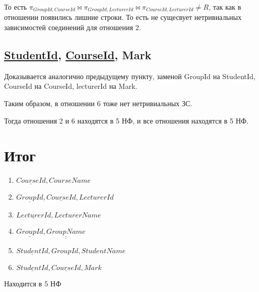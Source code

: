 \documentclass{article}
\begin{document}
	
	То есть $\pi_{GroupId, CourseId} \bowtie \pi_{GroupId, LecturerId} \bowtie  \pi_{CourseId, LecturerId} \neq R$, так как в отношении появились лишние строки. То есть не сущесвует нетривиальных зависимостей соединений для отношения 2.
	
	\subsection{\underline{StudentId}, \underline{CourseId}, Mark}
	
	Доказывается аналогично предыдущему пункту, заменой GroupId на StudentId, CourseId на CourseId, lecturerId на Mark.
	
	Таким образом, в отношении 6 тоже нет нетривиальных ЗС.
	
	Тогда отношения 2 и 6 находятся в 5 НФ, и все отношения находятся в 5 НФ.
	
	\section{Итог}
	
	\begin{enumerate}
		\item $\underline{CourseId}, CourseName$
		\item $\underline{GroupId}, \underline{CourseId}, LecturerId$
		\item $\underline{LecturerId}, LecturerName$
		\item $\underline{GroupId}, \underline{\underline{GroupName}}$
		\item $\underline{StudentId}, GroupId, StudentName$
		\item $\underline{StudentId}, \underline{CourseId}, Mark$
	\end{enumerate}

	Находится в 5 НФ
		
\end{document}
